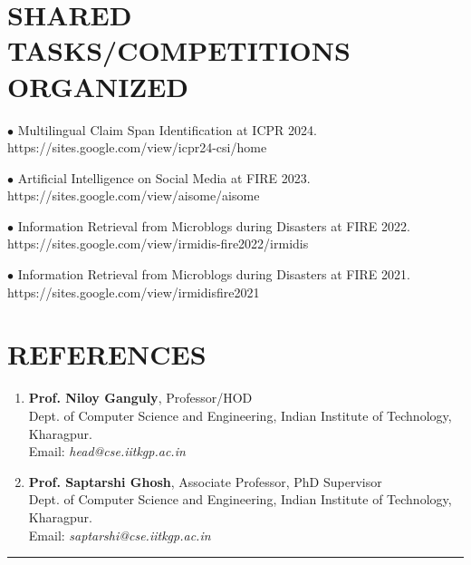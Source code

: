 \documentclass[paper=a4,fontsize=10pt]{scrartcl} %
\newcommand{\sepspace}{\vspace*{0.6em}}		%
\newcommand{\NewPart}[1]{\section*{\uppercase{#1}}}
\begin{document}
\NewPart{Shared Tasks/Competitions Organized}{}

{
\small
    \noindent $\bullet$ Multilingual Claim Span Identification at ICPR 2024. https://sites.google.com/view/icpr24-csi/home
     \sepspace

    \noindent $\bullet$ Artificial Intelligence on Social Media at FIRE 2023.
    https://sites.google.com/view/aisome/aisome
     \sepspace

    \noindent $\bullet$ Information Retrieval from Microblogs during Disasters at FIRE 2022.
    https://sites.google.com/view/irmidis-fire2022/irmidis
     \sepspace

    \noindent $\bullet$ Information Retrieval from Microblogs during Disasters at FIRE 2021.
    https://sites.google.com/view/irmidisfire2021
     \sepspace

}


\NewPart{References}
\vspace*{-1mm}
{ \small
\begin{enumerate}
    \item \textbf{Prof. Niloy Ganguly}, Professor/HOD \\
    Dept. of Computer Science and Engineering, Indian Institute of Technology, Kharagpur.\\
    Email: \textit{head@cse.iitkgp.ac.in}
    
    \item \textbf{Prof. Saptarshi Ghosh}, Associate Professor, PhD Supervisor \\
    Dept. of Computer Science and Engineering, Indian Institute of Technology, Kharagpur. \\
    Email: \textit{saptarshi@cse.iitkgp.ac.in}
\end{enumerate}
}

\sepspace





    
    
    

\hrule
\vspace*{-3mm}
\end{document}
